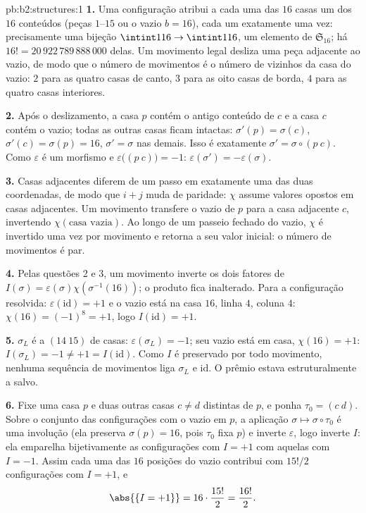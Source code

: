 \begin{solution}{pb:b2:structures:1}
\textbf{1.} Uma configuração atribui a cada uma das $16$ casas um
dos $16$ conteúdos (peças $1$--$15$ ou o vazio $b = 16$),
cada um exatamente uma vez: precisamente uma bijeção $\intint1{16} \to
\intint1{16}$, um elemento de $\mathfrak{S}_{16}$; há $16!
= 20\,922\,789\,888\,000$ delas. Um movimento legal desliza uma peça
adjacente ao vazio, de modo que o número de movimentos é o número de
vizinhos da casa do vazio: $2$ para as quatro casas de canto,
$3$ para as oito casas de borda, $4$ para as quatro casas interiores.

\textbf{2.} Após o deslizamento, a casa $p$ contém o antigo conteúdo de
$c$ e a casa $c$ contém o vazio; todas as outras casas ficam intactas:
$\sigma'(p) = \sigma(c)$, $\sigma'(c) = \sigma(p) = 16$,
$\sigma' = \sigma$ nas demais. Isso é exatamente $\sigma' = \sigma
\circ (p\ c)$. Como $\varepsilon$ é um morfismo e
$\varepsilon\bigl((p\ c)\bigr) = -1$:
$\varepsilon(\sigma') = -\varepsilon(\sigma)$.

\textbf{3.} Casas adjacentes diferem de um passo em exatamente uma
das duas coordenadas, de modo que $i + j$ muda de paridade: $\chi$ assume
valores opostos em casas adjacentes. Um movimento transfere o vazio
de $p$ para a casa adjacente $c$, invertendo $\chi(\text{casa vazia})$.
Ao longo de um passeio fechado do vazio, $\chi$ é invertido uma vez por movimento
e retorna a seu valor inicial: o número de movimentos é par.

\textbf{4.} Pelas questões 2 e 3, um movimento inverte os dois fatores de
$I(\sigma) = \varepsilon(\sigma)\chi(\sigma^{-1}(16))$; o
produto fica inalterado. Para a configuração resolvida:
$\varepsilon(\mathrm{id}) = +1$ e o vazio está na casa $16$,
linha $4$, coluna $4$: $\chi(16) = (-1)^{8} = +1$, logo
$I(\mathrm{id}) = +1$.

\textbf{5.} $\sigma_L$ é a  $(14\ 15)$ de casas:
$\varepsilon(\sigma_L) = -1$; seu vazio está em casa, $\chi(16) = +1$:
$I(\sigma_L) = -1 \neq +1 = I(\mathrm{id})$. Como $I$ é
preservado por todo movimento, nenhuma sequência de movimentos liga $\sigma_L$
e $\mathrm{id}$. O prêmio estava estruturalmente a salvo.

\textbf{6.} Fixe uma casa $p$ e duas outras casas $c \neq d$
distintas de $p$, e ponha $\tau_0 = (c\ d)$. Sobre o conjunto das
configurações com o vazio em $p$, a aplicação $\sigma \mapsto \sigma
\circ \tau_0$ é uma involução (ela preserva $\sigma(p) = 16$,
pois $\tau_0$ fixa $p$) e inverte $\varepsilon$, logo inverte
$I$: ela emparelha bijetivamente as configurações com $I = +1$ com
aquelas com $I = -1$. Assim cada uma das $16$ posições do vazio
contribui com $15!/2$ configurações com $I = +1$, e
\[
\abs{\{I = +1\}} = 16 \cdot \frac{15!}{2} = \frac{16!}{2}.
\]


\end{solution}
